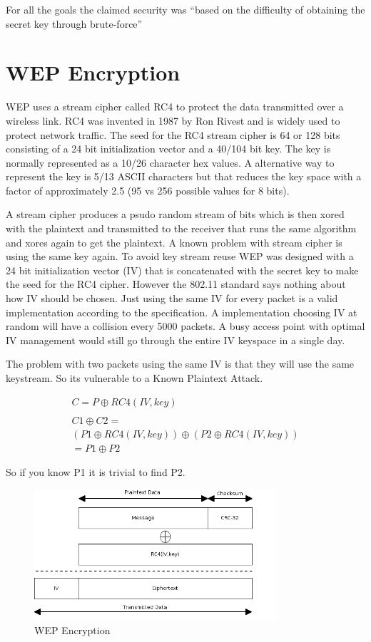 \documentclass[twocolumn,11pt]{IEEEtran}
\begin{document}
For all the goals the claimed security was ``based on the difficulty of obtaining the secret key through brute-force'' \cite{IEEE:Fast}



\section {WEP Encryption}
\label{sec:WEP_Encryption}

WEP uses a stream cipher called RC4 to protect the data transmitted over a wireless link. RC4 was invented in 1987 by Ron Rivest and is widely used to protect network traffic. The seed for the RC4 stream cipher is 64 or 128 bits consisting of a 24 bit initialization vector and a 40/104 bit key. The key is normally represented as a 10/26 character hex values. A alternative way to represent the key is 5/13 ASCII characters but that reduces the key space with a factor of approximately 2.5 (95 vs 256 possible values for 8 bits).

A stream cipher produces a psudo random stream of bits which is then xored with the plaintext and transmitted to the receiver that runs the same algorithm and xores again to get the plaintext. A known problem with stream cipher is using the same key again. To avoid key stream reuse WEP was designed with a 24 bit initialization vector (IV) that is concatenated with the secret key to make the seed for the RC4 cipher. However the 802.11 standard says nothing about how IV should be chosen. Just using the same IV for every packet is a valid implementation according to the specification. A implementation choosing IV at random will have a collision every 5000 packets\cite{Borisov:New}. A busy access point with optimal IV management would still go through the entire IV keyspace in a single day.

The problem with two packets using the same IV is that they will use the same keystream. So its vulnerable to a Known Plaintext Attack.


\begin{align*}
C = P \oplus RC4(IV,key) \\ \\
C1 \oplus C2 = \\
(P1 \oplus RC4(IV,key) ) \oplus ( P2 \oplus RC4(IV,key)) \\
= P1 \oplus P2
\end{align*}

So if you know P1 it is trivial to find P2. 

\begin{figure}
\includegraphics[width=90mm]{WEP_Encryption.png}
\caption{WEP Encryption}
\end{figure}
\end{document}
